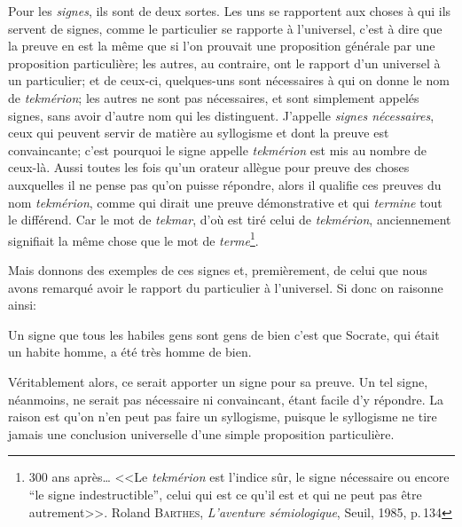 Pour les \emph{signes}, ils sont de deux sortes. Les uns se rapportent aux choses à qui ils servent de signes, comme le particulier se rapporte à l'universel,
c'est à dire que la preuve en est la même que si l'on prouvait une proposition générale par une proposition particulière; les autres, au contraire, ont
le rapport d'un universel à un particulier; et de ceux-ci, quelques-uns sont nécessaires à qui on donne le nom de \emph{tekmérion}; les autres ne sont
pas nécessaires, et sont simplement appelés signes, sans avoir d'autre nom qui les distinguent. J'appelle \emph{signes nécessaires}, ceux qui peuvent
servir de matière au syllogisme et dont la preuve est convaincante; c'est pourquoi le signe appelle \emph{tekmérion} est mis au nombre de ceux-là. Aussi
toutes les fois qu'un orateur allègue pour preuve des choses auxquelles il ne pense pas qu'on puisse répondre, alors il qualifie ces preuves du nom
\emph{tekmérion}, comme qui dirait une preuve démonstrative et qui \emph{termine} tout le différend. Car le mot de \emph{tekmar}, d'où est tiré celui de
\emph{tekmérion}, anciennement signifiait la même chose que le mot de \emph{terme}\footnote{300 ans après\dots{}
                                                                                        <<Le \emph{tekmérion} est l'indice sûr, le signe nécessaire
                                                                                        ou encore ``le signe indestructible'', celui qui est ce qu'il
                                                                                        est et qui ne peut pas être autrement>>. Roland \textsc{Barthes}, 
                                                                                        \emph{L'aventure sémiologique}, Seuil, 1985, p.\,134}.

\bigbreak

Mais donnons des exemples de ces signes et, premièrement, de celui que nous avons remarqué avoir le rapport du particulier à l'universel. Si donc on
raisonne ainsi:

\begin{emphpar}
      Un signe que tous les habiles gens sont gens de bien c'est que Socrate, qui était un habite homme, a été très homme de bien.
\end{emphpar}

Véritablement alors, ce serait apporter un signe pour sa preuve. Un tel signe, néanmoins, ne serait pas nécessaire ni convaincant, étant facile
d'y répondre. La raison est qu'on n'en peut pas faire un syllogisme, puisque le syllogisme ne tire jamais une conclusion universelle d'une simple
proposition particulière.


